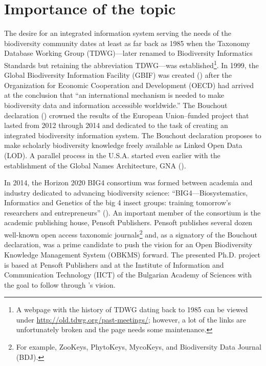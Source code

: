 \label{chapter-introduction} 
\newcommand{\keyword}[1]{\textbf{#1}}
\newcommand{\tabhead}[1]{\textbf{#1}}
\newcommand{\code}[1]{\texttt{#1}}
\newcommand{\file}[1]{\texttt{\bfseries#1}}
\newcommand{\option}[1]{\texttt{\itshape#1}}
\section*{Importance of the topic}
The desire for an integrated information system serving the needs of the biodiversity community dates at least as far back as 1985 when the Taxonomy Database Working Group (TDWG)---later renamed to Biodiversity Informatics Standards but retaining the abbreviation TDWG---was established\footnote{A webpage with the history of TDWG dating back to 1985 can be viewed under \href{http://old.tdwg.org/past-meetings/}{http://old.tdwg.org/past-meetings/}; however, a lot of the links are unfortunately broken and the page needs some maintenance.}. In 1999, the Global Biodiversity Information Facility (GBIF) was created (\cite{gbif_secretariat_what_nodate}) after the Organization for Economic Cooperation and Development (OECD) had arrived at the conclusion that ``an international mechanism is needed to make biodiversity data and information accessible worldwide.'' The Bouchout declaration (\cite{agosti_bouchout_2014}) crowned the results of the European Union--funded project \cite{noauthor_pro-ibiosphere_nodate} that lasted from 2012 through 2014 and dedicated to the task of creating an integrated biodiversity information system. The Bouchout declaration proposes to make scholarly biodiversity knowledge freely available as Linked Open Data (LOD).  A parallel process in the U.S.A. started even earlier with the establishment of the Global Names Architecture, GNA (\cite{patterson_names_2010,pyle_towards_2016}).

In 2014, the Horizon 2020 BIG4 consortium was formed between academia and industry dedicated to advancing biodiversity science: ``BIG4---Biosystematics, Informatics and Genetics of the big 4 insect groups: training tomorrow's researchers and entrepreneurs'' (\cite{university_of_copenhagen_big4_2014}). An important member of the consortium is the academic publishing house, Pensoft Publishers. Pensoft publishes several dozen well-known open access taxonomic journals\footnote{For example, ZooKeys, PhytoKeys, MycoKeys, and Biodiversity Data Journal (BDJ).} and, as a signatory of the Bouchout declaration, was a prime candidate to push the vision for an Open Biodiversity Knowledge Management System (OBKMS) forward. The presented Ph.D. project is based at Pensoft Publishers and at the Institute of Information and Communication Technology (IICT) of the Bulgarian Academy of Sciences with the goal to follow through \cite{noauthor_pro-ibiosphere_nodate}'s vision.

